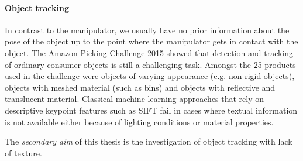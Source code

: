 \paragraph{Object tracking}
In contrast to the manipulator, we usually have no prior information about the pose of the object up to the point where the manipulator gets in contact with the object. The Amazon Picking Challenge 2015 \cite{Correll2016} showed that detection and tracking of ordinary consumer objects is still a challenging task. Amongst the 25 products used in the challenge were objects of varying appearance (e.g. non rigid objects), objects with meshed material (such as bins) and objects with reflective and translucent material. Classical machine learning approaches that rely on descriptive keypoint features such as SIFT fail in cases where textual information is not available either because of lighting conditions or material properties.

The \emph{secondary aim} of this thesis is the investigation of object tracking with lack of texture.
